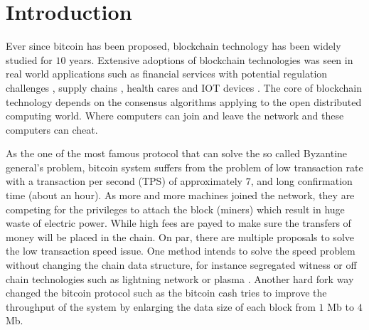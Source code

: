 \section{Introduction}
Ever since bitcoin \cite{nakamoto2008bitcoin} has been proposed, blockchain technology has been widely studied for $10$ years. 
Extensive adoptions of blockchain technologies was seen in real world applications such as 
financial services with potential regulation challenges \cite{michael2018blockchain, tapscott2017blockchain}, 
supply chains \cite{korpela2017digital,tian2016agri, abeyratne2016blockchain}, 
health cares \cite{azaria2016medrec,yue2016healthcare} and IOT devices \cite{christidis2016blockchains}.
The core of blockchain technology depends on the consensus algorithms applying to the open distributed computing world.
Where computers can join and leave the network and these computers can cheat.

As the one of the most famous protocol that can solve the so called Byzantine general's problem, 
bitcoin system suffers from the problem of low transaction rate with a transaction per second (TPS) of approximately $7$, and long confirmation time (about an hour).
As more and more machines joined the network, they are competing for the privileges to attach the block (miners) which result in huge waste of electric power.
While high fees are payed to make sure the transfers of money will be placed in the chain.
On par, there are multiple proposals to solve the low transaction speed issue. 
One method intends to solve the speed problem without changing the chain data structure, for instance segregated witness \cite{lombrozo2015segregated} 
or off chain technologies such as lightning network \cite{poon2016bitcoin} or plasma \cite{poon2017plasma}. 
Another hard fork way changed the bitcoin protocol such as the bitcoin cash tries to improve the throughput of the system by enlarging the data size of each block from $1$ Mb to $4$ Mb. 

